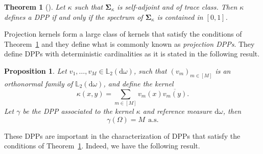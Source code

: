 \documentclass[twoside,11pt]{book}
\newtheorem{theorem}{Theorem}
\newtheorem{proposition}{Proposition}
\numberwithin{theorem}{chapter}
\numberwithin{definition}{chapter}
\numberwithin{proposition}{chapter}
\numberwithin{corollary}{chapter}
\numberwithin{example}{chapter}
\numberwithin{lemma}{chapter}
\begin{document}
\begin{theorem} [\cite{Mac75,Sos00}] \label{thm:mac_sos}
Let $\kappa$ such that $\bm{\Sigma}_{\kappa}$ is self-adjoint and of trace class. 
Then $\kappa$ defines a DPP if and only if the spectrum of $\bm{\Sigma}_{\kappa}$ is contained in $[0,1]$.
\end{theorem}
Projection kernels form a large class of kernels that satisfy the conditions of Theorem~\ref{thm:mac_sos} and they define what is commonly known as \emph{projection DPPs}. They define DPPs with deterministic cardinalities as it is stated in the following result.


\begin{proposition}\label{prop:projection_DPP_cardinality}
Let $v_{1}, \dots, v_{M} \in \mathbb{L}_{2}(\mathrm{d}\omega)$, such that $(v_{m})_{m \in [M]}$ is an orthonormal family of $\mathbb{L}_{2}(\mathrm{d}\omega)$, and define the kernel
\begin{equation}
\kappa(x,y) = \sum\limits_{m \in [M]}v_{m}(x)\overline{v_{m}(y)}. 
\end{equation} 
Let $\gamma$ be the DPP associated to the kernel $\kappa$ and reference measure $\mathrm{d}\omega$, then 
\begin{equation}
\gamma(\Omega) = M \:\: \text{a.s.}
\end{equation}


\end{proposition}


These DPPs are important in the characterization of DPPs that satisfy the conditions of Theorem~\ref{thm:mac_sos}. Indeed, we have the following result. 
\end{document}
